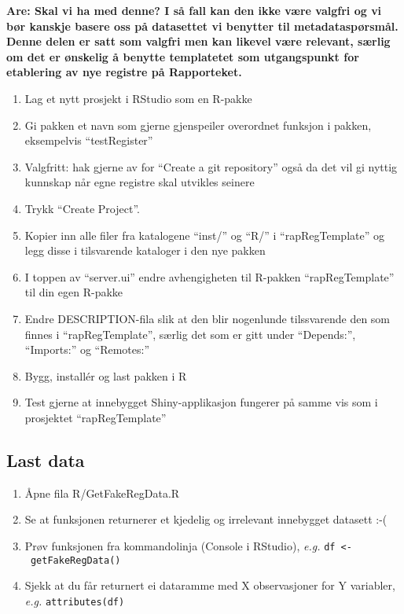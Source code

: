 \documentclass[]{article}
\providecommand{\tightlist}{%
  \setlength{\itemsep}{0pt}\setlength{\parskip}{0pt}}
\def\labelenumi{\arabic{enumi}.}
\begin{document}
\bf{Are: Skal vi ha med denne? I så fall kan den ikke være valgfri og vi bør kanskje basere oss på datasettet vi benytter til metadataspørsmål.}
Denne delen er satt som valgfri men kan likevel være relevant, særlig om det er ønskelig å benytte templatetet som utgangspunkt for etablering av nye registre på Rapporteket.

\begin{enumerate}
\def\labelenumi{\arabic{enumi}.}
\tightlist
\item
  Lag et nytt prosjekt i RStudio som en R-pakke
\item
  Gi pakken et navn som gjerne gjenspeiler overordnet funksjon i pakken,
  eksempelvis ``testRegister''
\item
  Valgfritt: hak gjerne av for ``Create a git repository'' også da det
  vil gi nyttig kunnskap når egne registre skal utvikles seinere
\item
  Trykk ``Create Project''.
\item
  Kopier inn alle filer fra katalogene ``inst/'' og ``R/'' i
  ``rapRegTemplate'' og legg disse i tilsvarende kataloger i den nye
  pakken
\item
  I toppen av ``server.ui'' endre avhengigheten til R-pakken
  ``rapRegTemplate'' til din egen R-pakke
\item
  Endre DESCRIPTION-fila slik at den blir nogenlunde tilssvarende den
  som finnes i ``rapRegTemplate'', særlig det som er gitt under
  ``Depends:'', ``Imports:'' og ``Remotes:''
\item
  Bygg, installér og last pakken i R
\item
  Test gjerne at innebygget Shiny-applikasjon fungerer på samme vis som
  i prosjektet ``rapRegTemplate''
\end{enumerate}

\subsection{Last data}\label{last-data}

\begin{enumerate}
\def\labelenumi{\arabic{enumi}.}
\tightlist
\item
  Åpne fila R/GetFakeRegData.R
\item
  Se at funksjonen returnerer et kjedelig og irrelevant innebygget
  datasett :-(
\item
  Prøv funksjonen fra kommandolinja (Console i RStudio), \emph{e.g.}
  \texttt{df\ \textless{}-\ getFakeRegData()}
\item
  Sjekk at du får returnert ei dataramme med X observasjoner for Y
  variabler, \emph{e.g.} \texttt{attributes(df)}
\end{enumerate}
\end{document}
